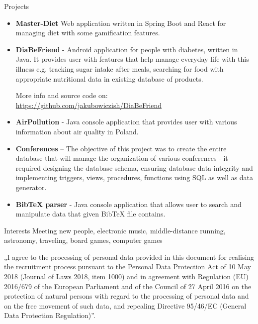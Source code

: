\documentclass{resume} %
\begin{document}
    \begin{rSection}{Projects}
        \begin{itemize}
            \setlength\itemsep{0em}

            \item \textbf{Master-Diet} Web application written in Spring Boot and React for managing diet with some gamification features.

            \item \textbf{DiaBeFriend} - Android application for people with diabetes, written in Java.
            It provides user with features that
            help manage everyday life with this illness e.g. tracking sugar intake after meals, searching for food with appropriate nutritional data in existing database of products.

            More info and source code on: \url{https://github.com/jakubowiczish/DiaBeFriend}

            \item \textbf{AirPollution} - Java console application that provides user with various information about air quality in Poland.

            \item \textbf{Conferences} – The objective of this project was to create the entire database that will manage the organization
            of various conferences - it required designing the database schema, ensuring database data integrity and
            implementing triggers, views, procedures, functions using SQL as well as data generator.

            \item \textbf{BibTeX parser} - Java console application that allows user to search and manipulate data that given BibTeX file
            contains.
        \end{itemize}
    \end{rSection}


    \begin{rSection}{Interests}
        Meeting new people, electronic music, middle-distance running, astronomy, traveling, board games, computer games
    \end{rSection}


    \vfill
    \footnotesize „I agree to the processing of personal data provided in this document for realising the recruitment process
    pursuant to the Personal Data Protection Act of 10 May 2018 (Journal of Laws 2018, item 1000) and in
    agreement with Regulation (EU) 2016/679 of the European Parliament and of the Council of 27 April 2016 on
    the protection of natural persons with regard to the processing of personal data and on the free movement of
    such data, and repealing Directive 95/46/EC (General Data Protection Regulation)”.
\end{document}
